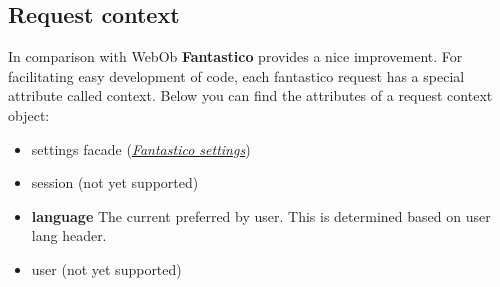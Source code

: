 \documentclass[letterpaper,10pt,english]{sphinxmanual}
\begin{document}
\subsection{Request context}
\label{features/request_response:request-context}
In comparison with WebOb \textbf{Fantastico} provides a nice improvement. For facilitating easy development of code, each fantastico
request has a special attribute called context. Below you can find the attributes of a request context object:
\begin{itemize}
\item {} 
settings facade ({\hyperref[get_started/settings::doc]{\emph{Fantastico settings}}})

\item {} 
session (not yet supported)

\item {} 
\textbf{language} The current preferred by user. This is determined based on user lang header.

\item {} 
user (not yet supported)

\end{itemize}
\end{document}
